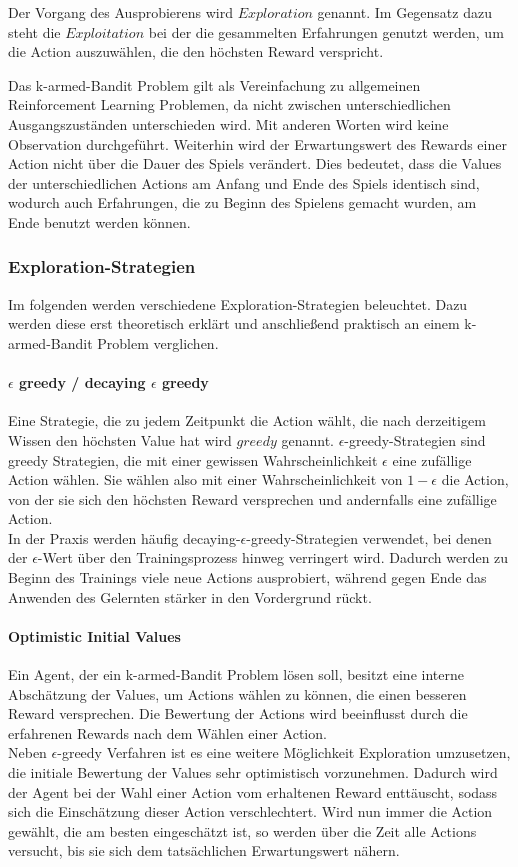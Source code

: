 \documentclass[11pt]{scrartcl}
\begin{document}
Der Vorgang des Ausprobierens wird $Exploration$ genannt. Im Gegensatz dazu steht die
$Exploitation$ bei der die gesammelten Erfahrungen genutzt werden, um die Action
auszuwählen, die den höchsten Reward verspricht.

Das k-armed-Bandit Problem gilt als Vereinfachung zu allgemeinen Reinforcement Learning
Problemen, da nicht zwischen unterschiedlichen Ausgangszuständen unterschieden wird. Mit
anderen Worten wird keine Observation durchgeführt. Weiterhin wird der Erwartungswert des
Rewards einer Action nicht über die Dauer des Spiels verändert. Dies bedeutet, dass die
Values der unterschiedlichen Actions am Anfang und Ende des Spiels identisch sind, wodurch
auch Erfahrungen, die zu Beginn des Spielens gemacht wurden, am Ende benutzt werden
können.


\subsubsection{Exploration-Strategien}
Im folgenden werden verschiedene Exploration-Strategien beleuchtet. Dazu werden diese erst
theoretisch erklärt und anschließend praktisch an einem k-armed-Bandit Problem verglichen.

\paragraph{$\epsilon$ greedy / decaying $\epsilon$ greedy}
Eine Strategie, die zu jedem Zeitpunkt die Action wählt, die nach derzeitigem Wissen den
höchsten Value hat wird $greedy$ genannt. $\epsilon$-greedy-Strategien sind greedy
Strategien, die mit einer gewissen Wahrscheinlichkeit $\epsilon$ eine zufällige Action
wählen. Sie wählen also mit einer Wahrscheinlichkeit von $1 - \epsilon$ die Action, von
der sie sich den höchsten Reward versprechen und andernfalls eine zufällige Action.\\
In der Praxis werden häufig decaying-$\epsilon$-greedy-Strategien verwendet, bei denen der
$\epsilon$-Wert über den Trainingsprozess hinweg verringert wird. Dadurch werden zu Beginn
des Trainings viele neue Actions ausprobiert, während gegen Ende das Anwenden des
Gelernten stärker in den Vordergrund rückt.

\paragraph{Optimistic Initial Values}
Ein Agent, der ein k-armed-Bandit Problem lösen soll, besitzt eine interne Abschätzung der
Values, um Actions wählen zu können, die einen besseren Reward versprechen. Die
Bewertung der Actions wird beeinflusst durch die erfahrenen Rewards nach dem Wählen einer
Action.\\
Neben $\epsilon$-greedy Verfahren ist es eine weitere Möglichkeit Exploration umzusetzen,
die initiale Bewertung der Values sehr optimistisch vorzunehmen. Dadurch wird der Agent
bei der Wahl einer Action vom erhaltenen Reward \grqq enttäuscht\grqq, sodass sich die
Einschätzung dieser Action verschlechtert. Wird nun immer die Action gewählt, die am
besten eingeschätzt ist, so werden über die Zeit alle Actions versucht, bis sie sich dem
tatsächlichen Erwartungswert nähern.
\end{document}

